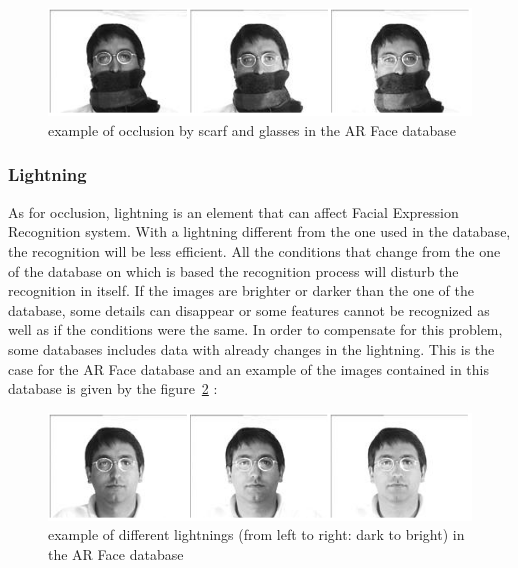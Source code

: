 \begin{figure}[!h]
\begin{center}
\noindent \includegraphics[scale=0.7]{figures/arface_example3} 
\newline
\caption{example of occlusion by scarf and glasses in the AR Face database}
\label{arface_example3}
\end{center} 
\end{figure} 

\subsubsection{Lightning}

\vspace{\baselineskip}
\noindent As for occlusion, lightning is an element that can affect Facial Expression Recognition system. With a lightning different from the one used in the database, the recognition will be less efficient. All the conditions that change from the one of the database on which is based the recognition process will disturb the recognition in itself. If the images are brighter or darker than the one of the database, some details can disappear or some features cannot be recognized as well as if the conditions were the same. In order to compensate for this problem, some databases includes data with already changes in the lightning. This is the case for the AR Face database and an example of the images contained in this database is given by the figure~\ref{arface_example1} \cite{ARFACE}:
\newline

\begin{figure}[!h]
\begin{center}
\noindent \includegraphics[scale=0.7]{figures/arface_example1} 
\newline
\caption{example of different lightnings (from left to right: dark to bright) in the AR Face database}
\label{arface_example1}
\end{center} 
\end{figure}

